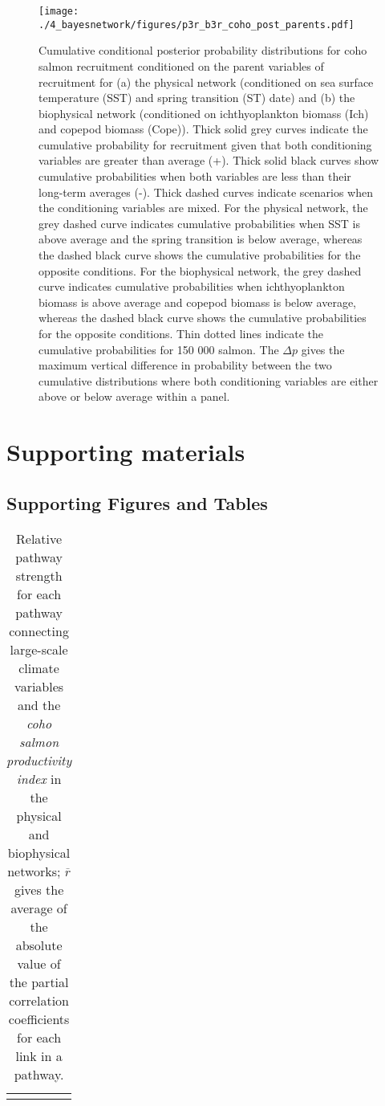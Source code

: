 \begin{figure}[htbp]
  \centering \texttt{[image: ./4\_bayesnetwork/figures/p3r\_b3r\_coho\_post\_parents.pdf]}
  \caption[Cumulative conditional posterior probability distributions for coho
    salmon recruitment conditioned on the parent variables of
    recruitment.]{Cumulative conditional posterior probability distributions for
    coho salmon recruitment conditioned on the parent variables of recruitment
    for (a) the physical network (conditioned on sea surface temperature (SST)
    and spring transition (ST) date) and (b) the biophysical network
    (conditioned on ichthyoplankton biomass (Ich) and copepod biomass (Cope)).
    Thick solid grey curves indicate the cumulative probability for recruitment
    given that both conditioning variables are greater than average (+). Thick
    solid black curves show cumulative probabilities when both variables are
    less than their long-term averages (-). Thick dashed curves indicate
    scenarios when the conditioning variables are mixed. For the physical
    network, the grey dashed curve indicates cumulative probabilities when SST
    is above average and the spring transition is below average, whereas the
    dashed black curve shows the cumulative probabilities for the opposite
    conditions. For the biophysical network, the grey dashed curve indicates
    cumulative probabilities when ichthyoplankton biomass is above average and
    copepod biomass is below average, whereas the dashed black curve shows the
    cumulative probabilities for the opposite conditions. Thin dotted lines
    indicate the cumulative probabilities for 150 000 salmon.  The \(\Delta p\)
    gives the maximum vertical difference in probability between the two
    cumulative distributions where both conditioning variables are either above
    or below average within a panel.}
  \label{fig:bn:8}
\end{figure}
\newpage



\section{Supporting materials}

\subsection{Supporting Figures and Tables}

{\small
  \libertineLF
  \begin{longtable}{lll}
    \caption[Relative pathway strength for each pathway connecting large-scale
      climate variables and the coho salmon productivity index.]{Relative
      pathway strength for each pathway connecting large-scale climate variables
      and the \emph{coho salmon productivity index} in the physical and
      biophysical networks; $\overline{r}$ gives the average of the absolute
      value of the partial correlation coefficients for each link in a pathway.} \\ 
    \hline
    
    \hline
    \label{tab:bn:s1}
  \end{longtable}
}


